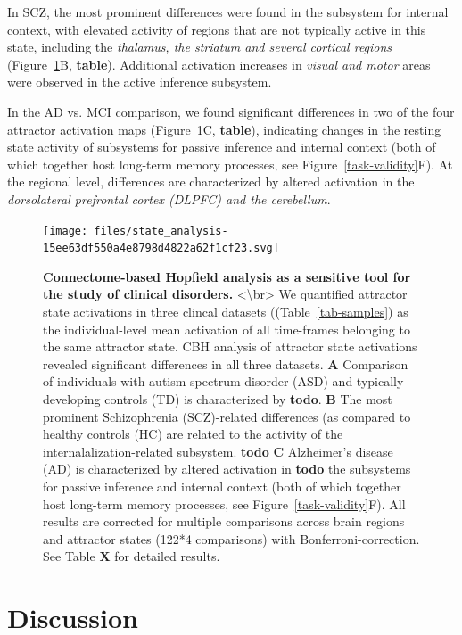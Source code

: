 \documentclass{article}
\begin{document}
In SCZ, the most prominent differences were found in the subsystem for internal context, with elevated activity of
regions that are not typically active in this state, including the \textit{thalamus, the striatum and several cortical regions}
(Figure~\ref{clinical-validity}B, \textbf{table}). Additional activation increases in \textit{visual and motor} areas were observed in
the active inference subsystem.

In the AD vs. MCI comparison, we found significant differences in two of the four attractor activation maps
(Figure~\ref{clinical-validity}C, \textbf{table}), indicating changes in the resting state activity of subsystems for passive
inference and internal context (both of which together host long-term memory processes, see Figure~\ref{task-validity}F).
At the regional level, differences are characterized by altered activation in the \textit{dorsolateral prefrontal cortex
(DLPFC) and the cerebellum}.

\begin{figure}[!htbp]
\centering
\texttt{[image: files/state\_analysis-15ee63df550a4e8798d4822a62f1cf23.svg]}
\caption[]{\textbf{Connectome-based Hopfield analysis as a sensitive tool for the study of clinical disorders.} \newline
\textless {\textbackslash}br\textgreater 
We quantified attractor state activations in three clincal datasets ((Table~\ref{tab-samples}) as the
individual-level mean activation of all time-frames belonging to the same attractor state. CBH analysis of attractor
state activations revealed significant differences in all three datasets.
\textbf{A} Comparison of individuals with autism spectrum disorder (ASD) and typically developing controls (TD) is
characterized by \textbf{todo}.
\textbf{B} The most prominent Schizophrenia (SCZ)-related differences (as compared to healthy controls (HC) are related to
the activity of the internalalization-related subsystem. \textbf{todo}
\textbf{C} Alzheimer's disease (AD) is characterized by altered activation in \textbf{todo} the subsystems for passive inference
and internal context (both of which together host long-term memory processes, see Figure~\ref{task-validity}F). All
results are corrected for multiple comparisons across brain regions and attractor states (122*4 comparisons)
with Bonferroni-correction. See Table \textbf{X} for detailed results.}
\label{clinical-validity}
\end{figure}

\section{Discussion}\label{Discussion}
\end{document}
